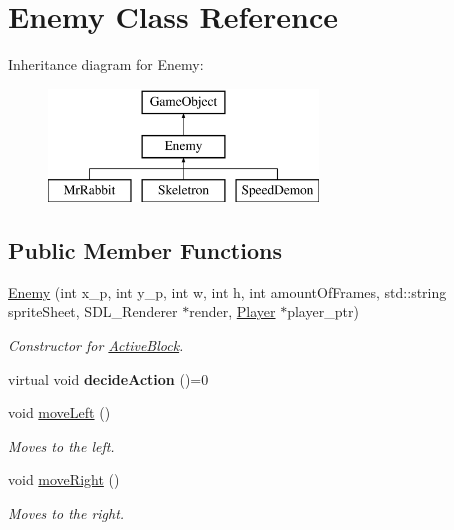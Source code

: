 \hypertarget{class_enemy}{}\section{Enemy Class Reference}
\label{class_enemy}
Inheritance diagram for Enemy\+:\begin{figure}[H]
\begin{center}
\leavevmode
\includegraphics[height=3.000000cm]{class_enemy}
\end{center}
\end{figure}
\subsection*{Public Member Functions}
\begin{DoxyCompactItemize}
\item 
\hyperlink{class_enemy_a82d8148ea7ca6fb9a77112014bb6682c}{Enemy} (int x\+\_\+p, int y\+\_\+p, int w, int h, int amount\+Of\+Frames, std\+::string sprite\+Sheet, S\+D\+L\+\_\+\+Renderer $\ast$render, \hyperlink{class_player}{Player} $\ast$player\+\_\+ptr)
\begin{DoxyCompactList}\small\item\em Constructor for \hyperlink{class_active_block}{Active\+Block}. \end{DoxyCompactList}\item 
\hypertarget{class_enemy_a4b883487df30d884389546d6d152a21b}{}virtual void {\bfseries decide\+Action} ()=0\label{class_enemy_a4b883487df30d884389546d6d152a21b}

\item 
void \hyperlink{class_enemy_a40d054c26a502f7dbd310f4b1fb51c5c}{move\+Left} ()
\begin{DoxyCompactList}\small\item\em Moves to the left. \end{DoxyCompactList}\item 
void \hyperlink{class_enemy_ab7fd09209895cb57198408f32cac8ce9}{move\+Right} ()
\begin{DoxyCompactList}\small\item\em Moves to the right. \end{DoxyCompactList}\end{DoxyCompactItemize}
